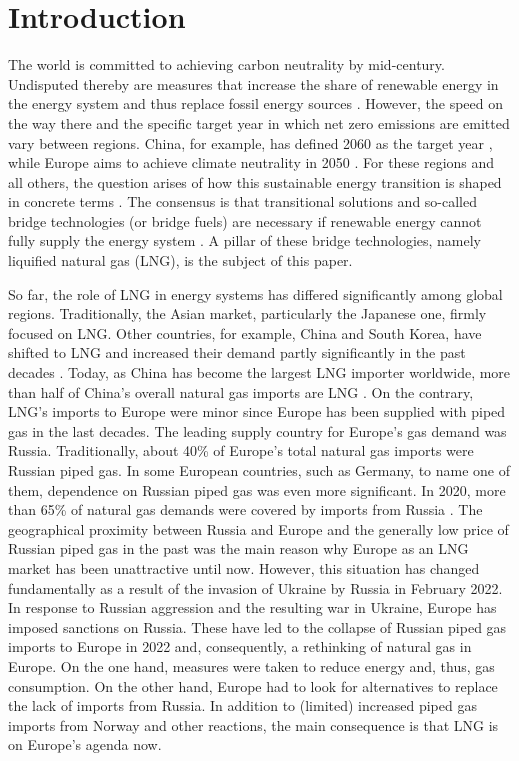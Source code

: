 \section{Introduction}
The world is committed to achieving carbon neutrality by mid-century. Undisputed thereby are measures that increase the share of renewable energy in the energy system and thus replace fossil energy sources \cite{yuan2022race}. However, the speed on the way there and the specific target year in which net zero emissions are emitted vary between regions. China, for example, has defined 2060 as the target year \cite{jia2021achieve}, while Europe aims to achieve climate neutrality in 2050 \cite{wolf2021european}. For these regions and all others, the question arises of how this sustainable energy transition is shaped in concrete terms \cite{capros2018outlook}. The consensus is that transitional solutions and so-called bridge technologies (or bridge fuels) are necessary if renewable energy cannot fully supply the energy system \cite{gursan2021systemic}. A pillar of these bridge technologies, namely liquified natural gas (LNG), is the subject of this paper.\vspace{0.35cm}                
           
So far, the role of LNG in energy systems has differed significantly among global regions. Traditionally, the Asian market, particularly the Japanese one, firmly focused on LNG. Other countries, for example, China and South Korea, have shifted to LNG and increased their demand partly significantly in the past decades \cite{aguilera2014role}. Today, as China has become the largest LNG importer worldwide, more than half of China's overall natural gas imports are LNG \cite{lngimports}. On the contrary, LNG's imports to Europe were minor since Europe has been supplied with piped gas in the last decades. The leading supply country for Europe's gas demand was Russia. Traditionally, about 40\% of Europe's total natural gas imports were Russian piped gas. In some European countries, such as Germany, to name one of them, dependence on Russian piped gas was even more significant. In 2020, more than 65\% of natural gas demands were covered by imports from Russia \cite{statista_gas}. The geographical proximity between Russia and Europe and the generally low price of Russian piped gas in the past was the main reason why Europe as an LNG market has been unattractive until now. However, this situation has changed fundamentally as a result of the invasion of Ukraine by Russia in February 2022. In response to Russian aggression and the resulting war in Ukraine, Europe has imposed sanctions on Russia. These have led to the collapse of Russian piped gas imports to Europe in 2022 and, consequently, a rethinking of natural gas in Europe. On the one hand, measures were taken to reduce energy and, thus, gas consumption. On the other hand, Europe had to look for alternatives to replace the lack of imports from Russia. In addition to (limited) increased piped gas imports from Norway and other reactions, the main consequence is that LNG is on Europe's agenda now.\vspace{0.35cm}          

